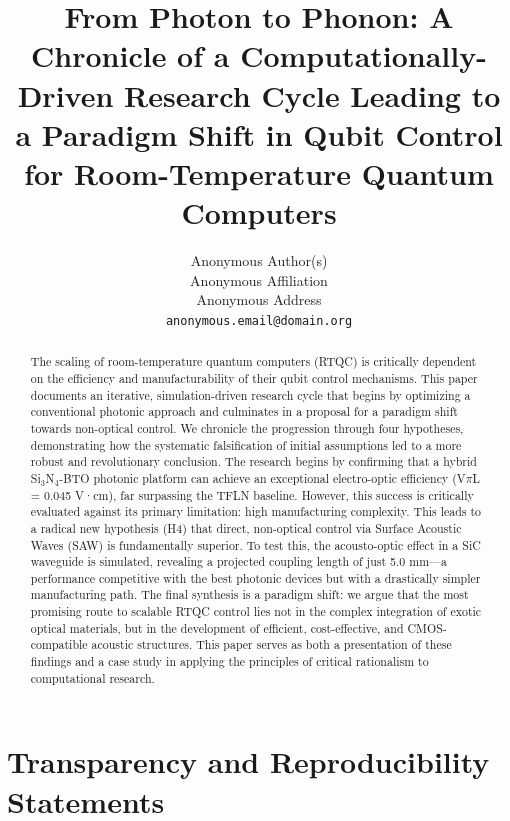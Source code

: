 \documentclass{article}
\title{From Photon to Phonon: A Chronicle of a Computationally-Driven Research Cycle Leading to a Paradigm Shift in Qubit Control for Room-Temperature Quantum Computers}
\author{%
  Anonymous Author(s) \\
  Anonymous Affiliation \\
  Anonymous Address \\
  \texttt{anonymous.email@domain.org} \\
}
\begin{document}

\maketitle

\begin{abstract}
The scaling of room-temperature quantum computers (RTQC) is critically dependent on the efficiency and manufacturability of their qubit control mechanisms. This paper documents an iterative, simulation-driven research cycle that begins by optimizing a conventional photonic approach and culminates in a proposal for a paradigm shift towards non-optical control. We chronicle the progression through four hypotheses, demonstrating how the systematic falsification of initial assumptions led to a more robust and revolutionary conclusion. The research begins by confirming that a hybrid Si$_3$N$_4$-BTO photonic platform can achieve an exceptional electro-optic efficiency (V$\pi$L = 0.045 V·cm), far surpassing the TFLN baseline. However, this success is critically evaluated against its primary limitation: high manufacturing complexity. This leads to a radical new hypothesis (H4) that direct, non-optical control via Surface Acoustic Waves (SAW) is fundamentally superior. To test this, the acousto-optic effect in a SiC waveguide is simulated, revealing a projected coupling length of just 5.0 mm—a performance competitive with the best photonic devices but with a drastically simpler manufacturing path. The final synthesis is a paradigm shift: we argue that the most promising route to scalable RTQC control lies not in the complex integration of exotic optical materials, but in the development of efficient, cost-effective, and CMOS-compatible acoustic structures. This paper serves as both a presentation of these findings and a case study in applying the principles of critical rationalism to computational research.
\end{abstract}

\section{Transparency and Reproducibility Statements}
\end{document}
